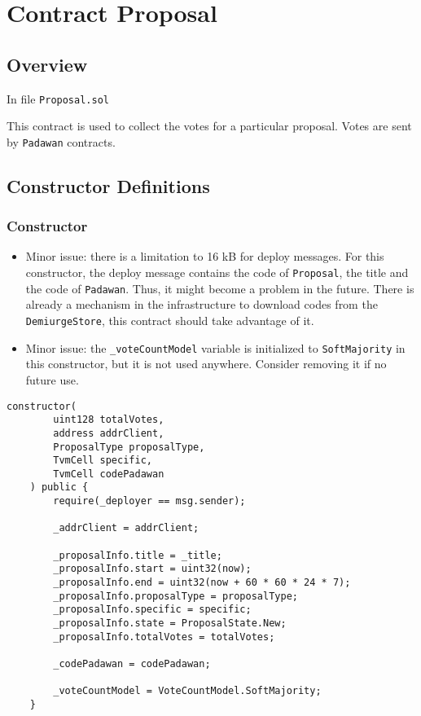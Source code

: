 
\chapter{Contract Proposal}

\minitoc


\section{Overview}

In file {\tt Proposal.sol}

This contract is used to collect the votes for a particular
proposal. Votes are sent by {\tt Padawan} contracts.

\section{Constructor Definitions}


\subsection{Constructor}

\begin{itemize}
\item Minor issue: there is a limitation to 16 kB for deploy
  messages. For this constructor, the deploy message contains the code
  of {\tt Proposal}, the title and the code of {\tt Padawan}. Thus, it
  might become a problem in the future. There is already a mechanism
  in the infrastructure to download codes from the {\tt
    DemiurgeStore}, this contract should take advantage of it.
\item Minor issue: the {\tt \_voteCountModel} variable is initialized
  to {\tt SoftMajority} in this constructor, but it is not used
  anywhere. Consider removing it if no future use.
\end{itemize}

\begin{lstlisting}[firstnumber=25]
    constructor(
        uint128 totalVotes,
        address addrClient,
        ProposalType proposalType,
        TvmCell specific,
        TvmCell codePadawan
    ) public {
        require(_deployer == msg.sender);

        _addrClient = addrClient;

        _proposalInfo.title = _title;
        _proposalInfo.start = uint32(now);
        _proposalInfo.end = uint32(now + 60 * 60 * 24 * 7);
        _proposalInfo.proposalType = proposalType;
        _proposalInfo.specific = specific;
        _proposalInfo.state = ProposalState.New;
        _proposalInfo.totalVotes = totalVotes;

        _codePadawan = codePadawan;

        _voteCountModel = VoteCountModel.SoftMajority;
    }
\end{lstlisting}

